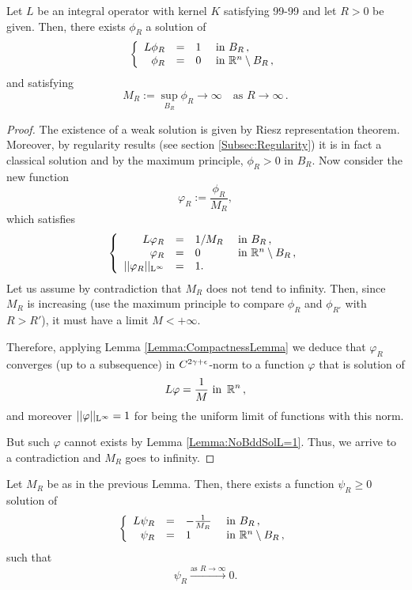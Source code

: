 \begin{lemma}
\label{Lemma:SolBall}
Let $L$ be an integral operator with kernel $K$ satisfying 99-99 and let $R>0$ be given. Then, there exists $\phi_R$ a solution of
\begin{equation*}
\left\{\begin{array}{rcll}
L \phi_R &=& 1 & \textrm{ in } B_R\,,\\
\phi_R &=& 0 & \textrm{ in } \mathbb{R}^n\setminus B_R\,,
\end{array} \right.
\end{equation*}
and satisfying
$$
M_R:= \sup_{B_R} \phi_R \to \infty \quad \text{as } R\to \infty\,.
$$
\end{lemma}
\begin{proof}
The existence of a weak solution is given by Riesz representation theorem. Moreover, by regularity results (see section \ref{Subsec:Regularity}) it is in fact a classical solution and by the maximum principle, $\phi_R>0$ in $B_R$. Now consider the new function
$$ \varphi_R := \frac{\phi_R}{M_R}, $$
which satisfies
\begin{equation}
\left\{\begin{array}{rcll}
L \varphi_R &=& 1/M_R & \textrm{ in } B_R\,,\\
\varphi_R &=& 0 & \textrm{ in } \mathbb{R}^n\setminus B_R\,, \label{Eq: varphi}\\
||\varphi_R||_{\mathrm{L}^{\infty}} &=& 1.
\end{array} \right.
\end{equation}
Let us assume by contradiction that $M_R$ does not tend to infinity. Then, since $M_R$ is increasing (use the maximum principle to compare $\phi_R$ and $\phi_{R'}$ with $R>R'$), it must have a limit $M<+\infty$.

Therefore, applying Lemma \ref{Lemma:CompactnessLemma} we deduce that $\varphi_R$ converges (up to a subsequence) in $C^{2\gamma+\epsilon}$-norm to a function $\varphi$ that is solution of
$$ L \varphi = \frac{1}{M}  \textrm{ in } \,\mathbb{R}^n\,, $$
and moreover $||\varphi||_{\mathrm{L}^{\infty}}=1$ for being the uniform limit of functions with this norm.

But such $\varphi$ cannot exists by Lemma \ref{Lemma:NoBddSolL=1}. Thus, we arrive to a contradiction and $M_R$ goes to infinity. 
\end{proof}

\begin{lemma}
\label{Lemma:SolBallToZero}
Let $M_R$ be as in the previous Lemma. Then, there exists a function $\psi_R\geq 0$ solution of
\begin{equation*}
\left\{\begin{array}{rcll}
L \psi_R &=& -\frac{1}{M_R} & \textrm{ in } B_R\,,\\
\psi_R &=& 1 & \textrm{ in } \mathbb{R}^n\setminus B_R\,,
\end{array} \right.
\end{equation*}
such that
$$ \psi_R \xrightarrow{\text{as } R\to \infty}{} 0. $$
\end{lemma}

